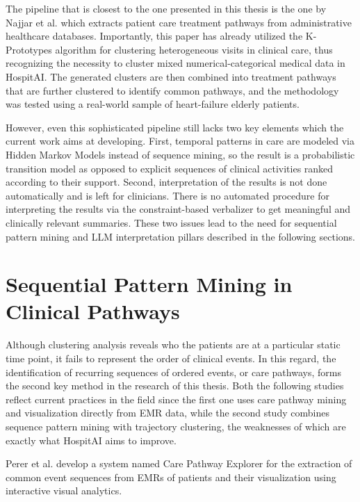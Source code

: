 The pipeline that is closest to the one presented in this thesis is the one by Najjar et al. \cite{najjar2018} which extracts patient care treatment pathways from administrative healthcare databases. Importantly, this paper has already utilized the K-Prototypes algorithm for clustering heterogeneous visits in clinical care, thus recognizing the necessity to cluster mixed numerical-categorical medical data in HospitAI. The generated clusters are then combined into treatment pathways that are further clustered to identify common pathways, and the methodology was tested using a real-world sample of heart-failure elderly patients.

However, even this sophisticated pipeline still lacks two key elements which the current work aims at developing. First, temporal patterns in care are modeled via Hidden Markov Models instead of sequence mining, so the result is a probabilistic transition model as opposed to explicit sequences of clinical activities ranked according to their support. Second, interpretation of the results is not done automatically and is left for clinicians. There is no automated procedure for interpreting the results via the constraint-based verbalizer to get meaningful and clinically relevant summaries. These two issues lead to the need for sequential pattern mining and LLM interpretation pillars described in the following sections.

\section{Sequential Pattern Mining in Clinical Pathways}\label{sec:rw_sequences}

Although clustering analysis reveals who the patients are at a particular static time point, it fails to represent the order of clinical events. In this regard, the identification of recurring sequences of ordered events, or care pathways, forms the second key method in the research of this thesis. Both the following studies reflect current practices in the field since the first one uses care pathway mining and visualization directly from EMR data, while the second study combines sequence pattern mining with trajectory clustering, the weaknesses of which are exactly what HospitAI aims to improve.

Perer et al. \cite{perer2015} develop a system named Care Pathway Explorer for the extraction of common event sequences from EMRs of patients and their visualization using interactive visual analytics.

